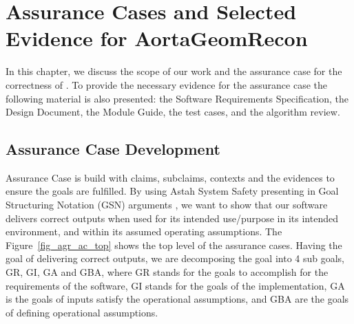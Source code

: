 \chapter{Assurance Cases and Selected Evidence for AortaGeomRecon}

In this chapter, we discuss the scope of our work and the assurance case for the correctness of \progname{}. To provide the necessary evidence for the assurance case the
following material is also presented: the Software Requirements Specification, the Design Document, the Module Guide, the test cases, and the algorithm review.

\section{Assurance Case Development}

Assurance Case is build with claims, subclaims, contexts and the evidences to ensure the goals are fulfilled. By using Astah System Safety presenting in Goal Structuring Notation (GSN) arguments \cite{Astah_2023}\cite{kelly2004goal}, we want to show that our software delivers correct outputs when used for its intended use/purpose in its intended environment, and within its assumed operating assumptions. The Figure~\ref{fig_agr_ac_top} shows the top level of the assurance cases. Having the goal of delivering correct outputs, we are decomposing the goal into 4 sub goals, GR, GI, GA and GBA, where GR stands for the goals to accomplish for the requirements of the software, GI stands for the goals of the implementation, GA is the goals of inputs satisfy the operational assumptions, and GBA are the goals of defining operational assumptions. 

